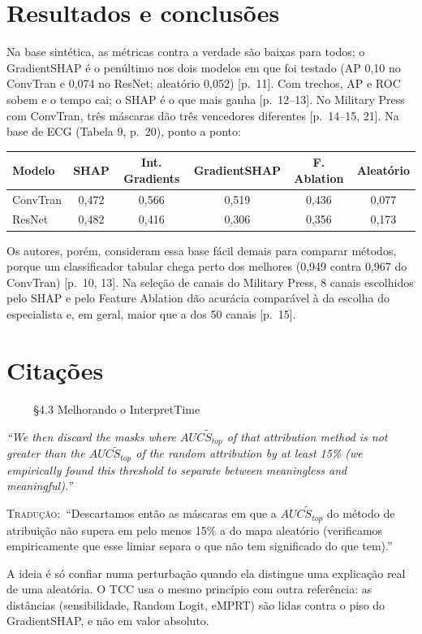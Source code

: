 \documentclass[11pt,a4paper]{article}
\newcommand{\pagechip}[1]{{\setlength{\fboxsep}{1.5pt}\colorbox{cAcc}{\textcolor{white}{\scriptsize\texttt{#1}}}}}
\newenvironment{origquote}{\par\itshape\small}{\par}
\newenvironment{tradquote}{\par\small\textsc{Tradução:}\ }{\par}
\newcommand{\explab}[1]{\par\smallskip{\small\color{cAcc}\textbf{\MakeUppercase{#1}}}\par}
\begin{document}
\section{Resultados e conclusões}
Na base sintética, as métricas contra a verdade são baixas para todos; o GradientSHAP é o penúltimo nos dois modelos em que foi testado (AP 0,10 no ConvTran e 0,074 no ResNet; aleatório 0,052) [p.~11]. Com trechos, AP e ROC sobem e o tempo cai; o SHAP é o que mais ganha [p.~12--13]. No Military Press com ConvTran, três máscaras dão três vencedores diferentes [p.~14--15, 21]. Na base de ECG (Tabela 9, p.~20), ponto a ponto:
\begin{center}\small
\begin{tabular}{lccccc}
\toprule
\textbf{Modelo} & \textbf{SHAP} & \textbf{Int. Gradients} & \textbf{GradientSHAP} & \textbf{F. Ablation} & \textbf{Aleatório} \\
\midrule
ConvTran & 0,472 & 0,566 & 0,519 & 0,436 & 0,077 \\
ResNet & 0,482 & 0,416 & 0,306 & 0,356 & 0,173 \\
\bottomrule
\end{tabular}
\end{center}
Os autores, porém, consideram essa base fácil demais para comparar métodos, porque um classificador tabular chega perto dos melhores (0,949 contra 0,967 do ConvTran) [p.~10, 13]. Na seleção de canais do Military Press, 8 canais escolhidos pelo SHAP e pelo Feature Ablation dão acurácia comparável à da escolha do especialista e, em geral, maior que a dos 50 canais [p.~15].

\section{Citações}

\begin{citacard}{\pagechip{p. 9} §4.3 Melhorando o InterpretTime}
\begin{origquote}“We then discard the masks where $AUC\tilde{S}_{top}$ of that attribution method is not greater than the $AUC\tilde{S}_{top}$ of the random attribution by at least 15\% (we empirically found this threshold to separate between meaningless and meaningful).”\end{origquote}
\begin{tradquote}“Descartamos então as máscaras em que a $AUC\tilde{S}_{top}$ do método de atribuição não supera em pelo menos 15\% a do mapa aleatório (verificamos empiricamente que esse limiar separa o que não tem significado do que tem).”\end{tradquote}
\explab{Explicação}
A ideia é só confiar numa perturbação quando ela distingue uma explicação real de uma aleatória. O TCC usa o mesmo princípio com outra referência: as distâncias (sensibilidade, Random Logit, eMPRT) são lidas contra o piso do GradientSHAP, e não em valor absoluto.
\end{citacard}
\end{document}
